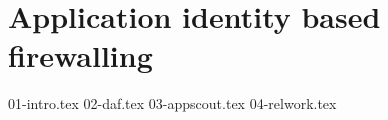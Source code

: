 \chapter{Application identity based firewalling}
\label{appfw:chapter}

{01-intro.tex}
{02-daf.tex}
{03-appscout.tex}
{04-relwork.tex}


